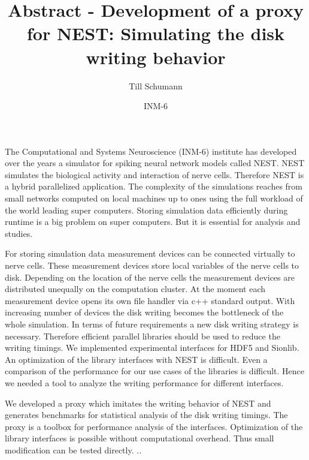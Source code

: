 \documentclass{article}
\title{Abstract - Development of a proxy for NEST: Simulating the disk writing behavior}
\author{Till Schumann}
\date{INM-6}
\begin{document}
   \maketitle

The Computational and Systems Neuroscience (INM-6) institute has developed over the years a simulator for spiking neural network models called NEST\cite{NEST}.
NEST simulates the biological activity and interaction of nerve cells. Therefore NEST is a hybrid parallelized application.
The complexity of the simulations reaches from small networks computed on local machines up to ones using the full workload of the world leading super computers.
Storing simulation data efficiently during runtime is a big problem on super computers.
But it is essential for analysis and studies.
\newline

For storing simulation data measurement devices can be connected virtually to nerve cells.
These measurement devices store local variables of the nerve cells to disk.
Depending on the location of the nerve cells the measurement devices are distributed unequally on the computation cluster.
At the moment each measurement device opens its own file handler via c++ standard output.
With increasing number of devices the disk writing becomes the bottleneck of the whole simulation.
In terms of future requirements a new disk writing strategy is necessary.
Therefore efficient parallel libraries should be used to reduce the writing timings.
We implemented experimental interfaces for HDF5\cite{hdf2010hierarchical} and Sionlib\cite{frings2009scalable}. 
An optimization of the library interfaces with NEST is difficult.
Even a comparison of the performance for our use cases of the libraries is difficult.
Hence we needed a tool to analyze the writing performance for different interfaces.  
\newline

We developed a proxy which imitates the writing behavior of NEST and generates benchmarks for statistical analysis of the disk writing timings.
The proxy is a toolbox for performance analysis of the interfaces.
Optimization of the library interfaces is possible without computational overhead.
Thus small modification can be tested directly.
\newline
..




\end{document}
